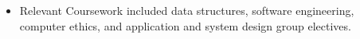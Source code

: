 \begin{itemize}
    \item Relevant Coursework included data structures, software engineering, computer ethics, and application and system design group electives.
\end{itemize}

\medskip
